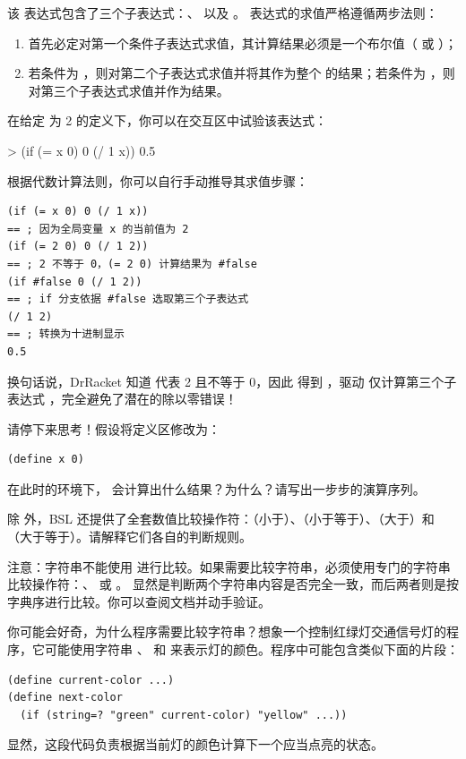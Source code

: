 该  表达式包含了三个子表达式：、 以及 。 表达式的求值严格遵循两步法则：
\begin{enumerate}
  \item 首先必定对第一个条件子表达式求值，其计算结果必须是一个布尔值（ 或 ）；
  \item 若条件为 ，则对第二个子表达式求值并将其作为整个  的结果；若条件为 ，则对第三个子表达式求值并作为结果。
\end{enumerate}

在给定  为 2 的定义下，你可以在交互区中试验该表达式：
\begin{replbox}
> (if (= x 0) 0 (/ 1 x))
0.5
\end{replbox}

根据代数计算法则，你可以自行手动推导其求值步骤：
\begin{lstlisting}[language=BSL]
(if (= x 0) 0 (/ 1 x))
== ; 因为全局变量 x 的当前值为 2
(if (= 2 0) 0 (/ 1 2))
== ; 2 不等于 0，(= 2 0) 计算结果为 #false
(if #false 0 (/ 1 2))
== ; if 分支依据 #false 选取第三个子表达式
(/ 1 2)
== ; 转换为十进制显示
0.5
\end{lstlisting}

换句话说，DrRacket 知道  代表 2 且不等于 0，因此  得到 ，驱动  仅计算第三个子表达式 ，完全避免了潜在的除以零错误！

请停下来思考！假设将定义区修改为：
\begin{lstlisting}[language=BSL]
(define x 0)
\end{lstlisting}
在此时的环境下， 会计算出什么结果？为什么？请写出一步步的演算序列。

除 \code{=} 外，BSL 还提供了全套数值比较操作符：\code{<}（小于）、\code{<=}（小于等于）、\code{>}（大于）和 \code{>=}（大于等于）。请解释它们各自的判断规则。

注意：字符串不能使用 \code{=} 进行比较。如果需要比较字符串，必须使用专门的字符串比较操作符：、 或 。 显然是判断两个字符串内容是否完全一致，而后两者则是按字典序进行比较。你可以查阅文档并动手验证。

你可能会好奇，为什么程序需要比较字符串？想象一个控制红绿灯交通信号灯的程序，它可能使用字符串 、 和  来表示灯的颜色。程序中可能包含类似下面的片段：
\begin{lstlisting}[language=BSL]
(define current-color ...)
(define next-color
  (if (string=? "green" current-color) "yellow" ...))
\end{lstlisting}
显然，这段代码负责根据当前灯的颜色计算下一个应当点亮的状态。

